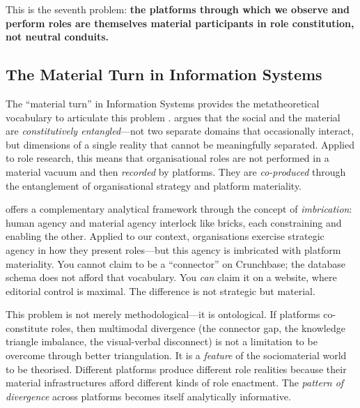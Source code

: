 \documentclass[../main.tex]{subfiles}
\begin{document}
This is the seventh problem: \textbf{the platforms through which we observe and perform roles are themselves material participants in role constitution, not neutral conduits.}

\subsection{The Material Turn in Information Systems}

The ``material turn'' in Information Systems provides the metatheoretical vocabulary to articulate this problem \cite{Orlikowski2007,orlikowski2008sociomateriality}. \textcite{Orlikowski2007} argues that the social and the material are \emph{constitutively entangled}---not two separate domains that occasionally interact, but dimensions of a single reality that cannot be meaningfully separated. Applied to role research, this means that organisational roles are not performed in a material vacuum and then \emph{recorded} by platforms. They are \emph{co-produced} through the entanglement of organisational strategy and platform materiality.

\textcite{leonardi2012materiality} offers a complementary analytical framework through the concept of \emph{imbrication}: human agency and material agency interlock like bricks, each constraining and enabling the other. Applied to our context, organisations exercise strategic agency in how they present roles---but this agency is imbricated with platform materiality. You cannot claim to be a ``connector'' on Crunchbase; the database schema does not afford that vocabulary. You \emph{can} claim it on a website, where editorial control is maximal. The difference is not strategic but material.

This problem is not merely methodological---it is ontological. If platforms co-constitute roles, then multimodal divergence (the connector gap, the knowledge triangle imbalance, the visual-verbal disconnect) is not a limitation to be overcome through better triangulation. It is a \emph{feature} of the sociomaterial world to be theorised. Different platforms produce different role realities because their material infrastructures afford different kinds of role enactment. The \emph{pattern of divergence} across platforms becomes itself analytically informative.
\end{document}
